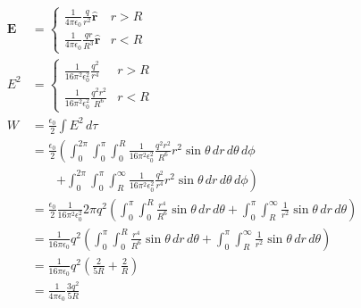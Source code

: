 \documentclass{article}
\renewcommand{\vec}[1]{\boldsymbol{\mathbf{#1}}}
\newcommand{\uvec}[1]{\hat{\vec{#1}}}
\newcommand{\ke}{\frac{1}{4 \pi \epsilon_0}}
\begin{document}
\begin{enumerate}
        \begin{align*}
          \vec{E} & = \begin{cases}
                        \ke \frac{q}{r^2} \uvec{r}   & r > R \\
                        \ke \frac{q r}{R^3} \uvec{r} & r < R
                      \end{cases}                                                                                                                                                                                 \\
          E^2     & = \begin{cases}
                        \frac{1}{16 \pi^2 \epsilon_0^2} \frac{q^2}{r^4}     & r > R \\
                        \frac{1}{16 \pi^2 \epsilon_0^2} \frac{q^2 r^2}{R^6} & r < R
                      \end{cases}                                                                                                                                                          \\
          W       & = \frac{\epsilon_0}{2} \int E^2 \,d \tau                                                                                                                                                                               \\
                  & = \frac{\epsilon_0}{2} \left( \int_0^{2 \pi} \int_0^\pi \int_0^R \frac{1}{16 \pi^2 \epsilon_0^2} \frac{q^2 r^2}{R^6} r^2 \sin \theta \,d r \,d \theta \,d \phi \right.                                                 \\
                  & \qquad \left. + \int_0^{2 \pi} \int_0^\pi \int_R^\infty \frac{1}{16 \pi^2 \epsilon_0^2} \frac{q^2}{r^4} r^2 \sin \theta \,d r \,d \theta \,d \phi \right)                                                              \\
                  & = \frac{\epsilon_0}{2} \frac{1}{16 \pi^2 \epsilon_0^2} 2 \pi q^2 \left( \int_0^\pi \int_0^R \frac{r^4}{R^6} \sin \theta \,d r \,d \theta + \int_0^\pi \int_R^\infty \frac{1}{r^2} \sin \theta \,d r \,d \theta \right) \\
                  & = \frac{1}{16 \pi \epsilon_0} q^2 \left( \int_0^\pi \int_0^R \frac{r^4}{R^6} \sin \theta \,d r \,d \theta + \int_0^\pi \int_R^\infty \frac{1}{r^2} \sin \theta \,d r \,d \theta \right)                                \\
                  & = \frac{1}{16 \pi \epsilon_0} q^2 \left( \frac{2}{5 R} + \frac{2}{R} \right)                                                                                                                                           \\
                  & = \frac{1}{4 \pi \epsilon_0} \frac{3 q^2}{5 R}
        \end{align*}


\end{enumerate}
\end{document}
